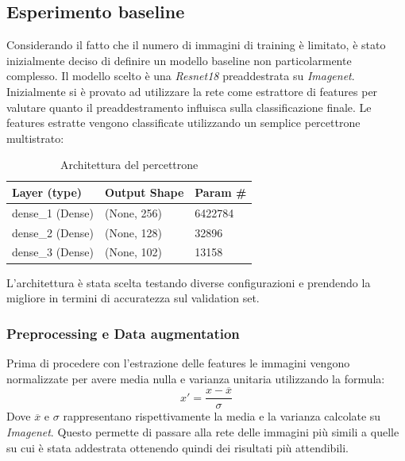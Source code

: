 \subsection{Esperimento baseline}
Considerando il fatto che il numero di immagini di training è limitato, è stato inizialmente deciso di definire un modello baseline non particolarmente complesso. Il modello scelto è una \textit{Resnet18} \cite{he2015deep} preaddestrata su \textit{Imagenet}. Inizialmente si è provato ad utilizzare la rete come estrattore di features per valutare quanto il preaddestramento influisca sulla classificazione finale. 
Le features estratte vengono classificate utilizzando un semplice percettrone multistrato:
\begin{table}[H]
\centering
\caption{Architettura del percettrone}
\begin{tabular}{lll}
\hline
Layer (type)     & Output Shape & Param \# \\ \hline
dense\_1 (Dense) & (None, 256)  & 6422784  \\ \hline
dense\_2 (Dense) & (None, 128)  & 32896    \\ \hline
dense\_3 (Dense) & (None, 102)  & 13158    \\ \hline
\end{tabular}
\label{t_mlp}
\end{table}
L'architettura è stata scelta testando diverse configurazioni e prendendo la migliore in termini di accuratezza sul validation set.
\subsubsection{Preprocessing e Data augmentation}
Prima di procedere con l'estrazione delle features le immagini vengono normalizzate per avere media nulla e varianza unitaria utilizzando la formula:
\begin{equation}
x' = \frac{x - \overline{x}}{\sigma}
\end{equation}
Dove $ \overline{x} $ e $ \sigma $ rappresentano rispettivamente la media e la varianza calcolate su \textit{Imagenet}.
Questo permette di passare alla rete delle immagini più simili a quelle su cui è stata addestrata ottenendo quindi dei risultati più attendibili.
